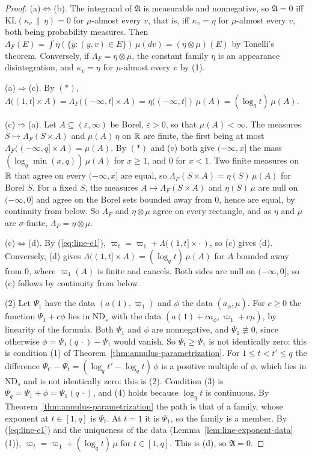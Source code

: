 \begin{proof}
(a)$\Leftrightarrow$(b). The integrand of $\mathfrak{A}$ is measurable and nonnegative, so
$\mathfrak{A} = 0$ iff $\mathrm{KL}(\kappa_v \,\|\, \eta) = 0$ for $\mu$-almost every $v$, that is,
iff $\kappa_v = \eta$ for $\mu$-almost every $v$, both being probability measures. Then
$\Lambda_F(E) = \int\eta(\{y : (y,v) \in E\})\,\mu(dv) = (\eta \otimes \mu)(E)$ by Tonelli's
theorem. Conversely, if $\Lambda_F = \eta \otimes \mu$, the constant family $\eta$ is an appearance
disintegration, and $\kappa_v = \eta$ for $\mu$-almost every $v$ by (1).

(a)$\Rightarrow$(c). By $(*)$, $\Lambda((1,t] \times A) = \Lambda_F((-\infty,t] \times A)
= \eta((-\infty,t])\,\mu(A) = (\log_qt)\,\mu(A)$.

(c)$\Rightarrow$(a). Let $A \subseteq (\varepsilon,\infty)$ be Borel, $\varepsilon > 0$, so that
$\mu(A) < \infty$. The measures $S \mapsto \Lambda_F(S \times A)$ and $\mu(A)\,\eta$ on $\mathbb{R}$ are
finite, the first being at most $\Lambda_F((-\infty,q] \times A) = \mu(A)$. By $(*)$ and (c) both
give $(-\infty,x]$ the mass $(\log_q\min(x,q))\,\mu(A)$ for $x \ge 1$, and $0$ for $x < 1$. Two
finite measures on $\mathbb{R}$ that agree on every $(-\infty,x]$ are equal, so
$\Lambda_F(S \times A) = \eta(S)\,\mu(A)$ for Borel $S$. For a fixed $S$, the measures
$A \mapsto \Lambda_F(S \times A)$ and $\eta(S)\,\mu$ are null on $(-\infty,0]$ and agree on the
Borel sets bounded away from $0$, hence are equal, by continuity from below. So $\Lambda_F$ and
$\eta \otimes \mu$ agree on every rectangle, and as $\eta$ and $\mu$ are $\sigma$-finite,
$\Lambda_F = \eta \otimes \mu$.

(c)$\Leftrightarrow$(d). By (\ref{eq:line-e1}), $\varpi_t = \varpi_1 + \Lambda((1,t] \times \cdot\,)$, so (c)
gives (d). Conversely, (d) gives $\Lambda((1,t] \times A) = (\log_qt)\,\mu(A)$ for $A$ bounded away
from $0$, where $\varpi_1(A)$ is finite and cancels. Both sides are null on $(-\infty,0]$, so (c)
follows by continuity from below.

(2) Let $\Psi_1$ have the data $(a(1), \varpi_1)$ and $\phi$ the data $(a_\phi, \mu)$. For $c \ge 0$
the function $\Psi_1 + c\phi$ lies in $\mathrm{ND}_s$ with the data
$(a(1) + ca_\phi, \varpi_1 + c\mu)$, by linearity of the formula. Both $\Psi_1$ and $\phi$ are
nonnegative, and $\Psi_1 \not\equiv 0$, since otherwise $\phi = \Psi_1(q\,\cdot) - \Psi_1$ would
vanish. So $\Psi_t \ge \Psi_1$ is not identically zero: this is condition (1) of
Theorem~\ref{thm:annulus-parametrization}. For $1 \le t < t' \le q$ the difference
$\Psi_{t'} - \Psi_t = (\log_qt' - \log_qt)\,\phi$ is a positive multiple of $\phi$, which lies in
$\mathrm{ND}_s$ and is not identically zero: this is (2). Condition (3) is
$\Psi_q = \Psi_1 + \phi = \Psi_1(q\,\cdot)$, and (4) holds because $\log_qt$ is continuous. By
Theorem~\ref{thm:annulus-parametrization} the path is that of a family, whose exponent at
$t \in [1,q]$ is $\Psi_t$. At $t = 1$ it is $\Psi_1$, so the family is a member. By
(\ref{eq:line-e1}) and the uniqueness of the data (Lemma~\ref{lem:line-exponent-data}(1)),
$\varpi_t = \varpi_1 + (\log_qt)\,\mu$ for $t \in [1,q]$. This is (d), so $\mathfrak{A} = 0$.


\end{proof}
